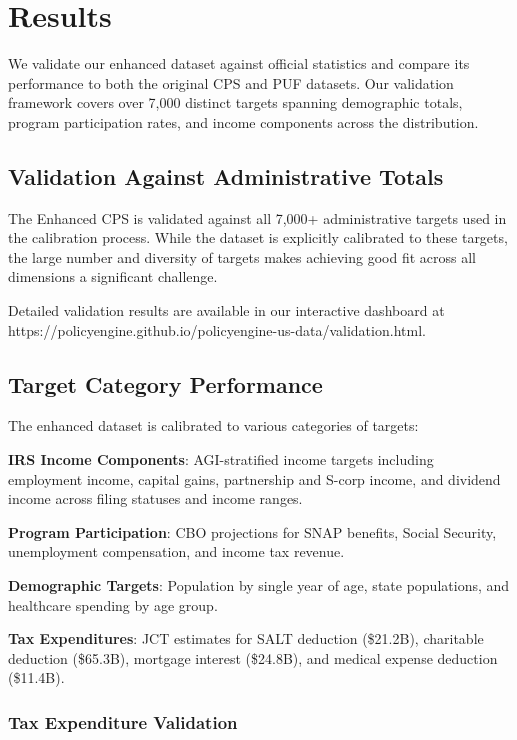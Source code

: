 \section{Results}

We validate our enhanced dataset against official statistics and compare its performance to both the original CPS and PUF datasets. Our validation framework covers over 7,000 distinct targets spanning demographic totals, program participation rates, and income components across the distribution.

\subsection{Validation Against Administrative Totals}

The Enhanced CPS is validated against all 7,000+ administrative targets used in the calibration process. While the dataset is explicitly calibrated to these targets, the large number and diversity of targets makes achieving good fit across all dimensions a significant challenge.

Detailed validation results are available in our interactive dashboard at https://policyengine.github.io/policyengine-us-data/validation.html.

\subsection{Target Category Performance}

The enhanced dataset is calibrated to various categories of targets:

\textbf{IRS Income Components}: AGI-stratified income targets including employment income, capital gains, partnership and S-corp income, and dividend income across filing statuses and income ranges.

\textbf{Program Participation}: CBO projections for SNAP benefits, Social Security, unemployment compensation, and income tax revenue.

\textbf{Demographic Targets}: Population by single year of age, state populations, and healthcare spending by age group.

\textbf{Tax Expenditures}: JCT estimates for SALT deduction (\$21.2B), charitable deduction (\$65.3B), mortgage interest (\$24.8B), and medical expense deduction (\$11.4B).

\subsubsection{Tax Expenditure Validation}

